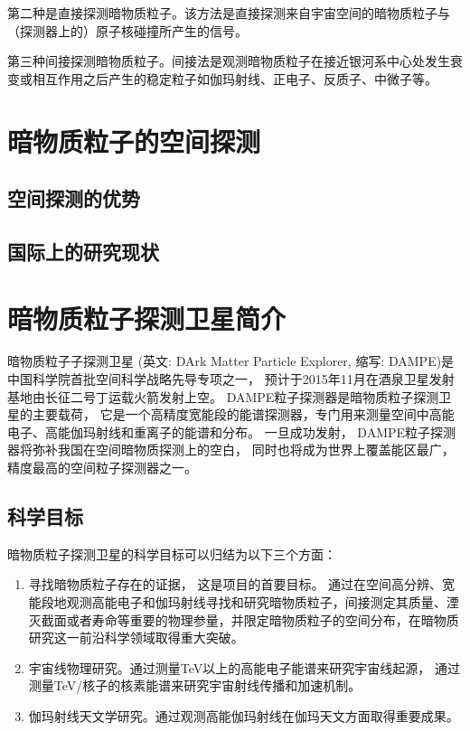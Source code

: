 第二种是直接探测暗物质粒子。该方法是直接探测来自宇宙空间的暗物质粒子与（探测器上的）原子核碰撞所产生的信号。

第三种间接探测暗物质粒子。间接法是观测暗物质粒子在接近银河系中心处发生衰变或相互作用之后产生的稳定粒子如伽玛射线、正电子、反质子、中微子等。

\section{暗物质粒子的空间探测}
\subsection{空间探测的优势}

\subsection{国际上的研究现状}

\section{暗物质粒子探测卫星简介}
暗物质粒子子探测卫星 (英文: DArk Matter Particle Explorer, 缩写: DAMPE)是中国科学院首批空间科学战略先导专项之一， 预计于2015年11月在酒泉卫星发射基地由长征二号丁运载火箭发射上空。
DAMPE粒子探测器是暗物质粒子探测卫星的主要载荷， 它是一个高精度宽能段的能谱探测器，专门用来测量空间中高能电子、高能伽玛射线和重离子的能谱和分布。
一旦成功发射， DAMPE粒子探测器将弥补我国在空间暗物质探测上的空白， 同时也将成为世界上覆盖能区最广，精度最高的空间粒子探测器之一。

\subsection{科学目标}
暗物质粒子探测卫星的科学目标可以归结为以下三个方面：
\begin{enumerate}
	\item 寻找暗物质粒子存在的证据， 这是项目的首要目标。 通过在空间高分辨、宽能段地观测高能电子和伽玛射线寻找和研究暗物质粒子，间接测定其质量、湮灭截面或者寿命等重要的物理参量，并限定暗物质粒子的空间分布，在暗物质研究这一前沿科学领域取得重大突破。
	\item 宇宙线物理研究。通过测量TeV以上的高能电子能谱来研究宇宙线起源， 通过测量TeV/核子的核素能谱来研究宇宙射线传播和加速机制。
	\item 伽玛射线天文学研究。通过观测高能伽玛射线在伽玛天文方面取得重要成果。
\end{enumerate}

